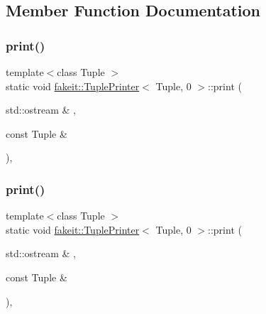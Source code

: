 \subsection{Member Function Documentation}
\mbox{\label{structfakeit_1_1TuplePrinter_3_01Tuple_00_010_01_4_a7ca7f3fd3db9f8f91171e29abbdce335}} 
\subsubsection{\texorpdfstring{print()}{print()}\hspace{0.1cm}{\footnotesize\ttfamily [1/9]}}
{\footnotesize\ttfamily template$<$class Tuple $>$ \\
static void \mbox{\hyperlink{structfakeit_1_1TuplePrinter}{fakeit\+::\+Tuple\+Printer}}$<$ Tuple, 0 $>$\+::print (\begin{DoxyParamCaption}\item[{std\+::ostream \&}]{,  }\item[{const Tuple \&}]{ }\end{DoxyParamCaption})\hspace{0.3cm}{\ttfamily [inline]}, {\ttfamily [static]}}

\mbox{\label{structfakeit_1_1TuplePrinter_3_01Tuple_00_010_01_4_a7ca7f3fd3db9f8f91171e29abbdce335}} 
\subsubsection{\texorpdfstring{print()}{print()}\hspace{0.1cm}{\footnotesize\ttfamily [2/9]}}
{\footnotesize\ttfamily template$<$class Tuple $>$ \\
static void \mbox{\hyperlink{structfakeit_1_1TuplePrinter}{fakeit\+::\+Tuple\+Printer}}$<$ Tuple, 0 $>$\+::print (\begin{DoxyParamCaption}\item[{std\+::ostream \&}]{,  }\item[{const Tuple \&}]{ }\end{DoxyParamCaption})\hspace{0.3cm}{\ttfamily [inline]}, {\ttfamily [static]}}

